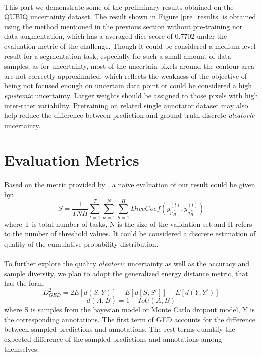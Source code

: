 \documentclass[12pt]{extarticle}
\begin{document}
\paragraph{}
This part we demonstrate some of the preliminary results obtained on the QUBIQ uncertainty dataset.
The result shown in Figure \ref{pre_results} is obtained using the method mentioned in the previous 
section without pre-training nor data augmentation, which has 
a averaged dice score of 0.7702 under the evaluation metric of the challenge. 
Though it could be considered a medium-level result for a segmentation task, especially for such
a small amount of data samples, as for uncertainty, most of the uncertain pixels around the contour area are not 
correctly approximated, which reflects the weakness of the objective of 
being not focused enough on uncertain data point or could be considered a high \textit{epistemic} uncertainty. 
Larger weights should be assigned to those pixels with high inter-rater variability. Pretraining on 
related single annotator dataset may also help reduce the difference between 
prediction and ground truth discrete \textit{aleatoric} uncertainty.
\section{Evaluation Metrics}
\paragraph{}
Based on the metric provided by \cite{qubiq}, a naive evaluation of our result could be given by:
\begin{equation}
    S = \frac{1}{TNH}\sum_{t=1}^{T}\sum_{n=1}^{N}\sum_{h=1}^{H}DiceCoef(y_{p\frac{h}{H}}^{(t)}, y_{g\frac{h}{H}}^{(t)})
\end{equation}
where T is total number of tasks, N is the size of the validation set and H refers to 
the number of threshold values. It could be considered a discrete estimation of quality of the cumulative probability 
distribution.
\paragraph{}
To further explore the quality \textit{aleatoric} uncertainty as well as the accuracy and sample diversity, we plan to 
adopt the generalized energy distance metric, that has the form:
\begin{equation}
    D^2_{GED} = 2E[d(S, Y)] - E[d[S, S']] - E[d(Y, Y')]
\end{equation}
\begin{equation}
    d(A, B) = 1 - IoU(A, B)
\end{equation}
where S is samples from the bayesian model or Monte Carlo dropout model, Y is the corresponding 
annotations. The first term of GED accounts for the difference between sampled predictions
and annotations. The rest terms quantify the expected difference of the sampled predictions and 
annotations among themselves. 
\end{document}
